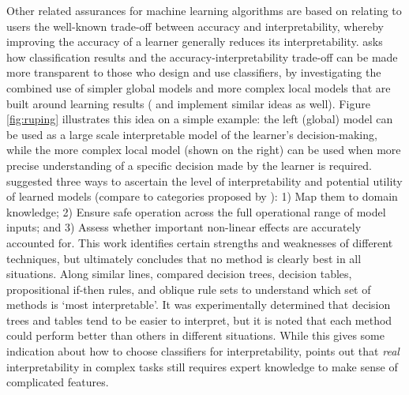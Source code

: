 Other related assurances for machine learning algorithms are based on relating to users the well-known trade-off between accuracy and interpretability, whereby improving the accuracy of a learner generally reduces its interpretability. \citet{Ruping2006-xj} asks how classification results and the accuracy-interpretability trade-off can be made more transparent to those who design and use classifiers, by investigating the combined use of simpler global models and more complex local models that are built around learning results (\citet{Otte2013-oo} and \citet{Ribeiro2016-uc} implement similar ideas as well). 
Figure \ref{fig:ruping} illustrates this idea on a simple example: the left (global) model can be used as a large scale interpretable model of the learner's decision-making, while the more complex local model (shown on the right) can be used when more precise understanding of a specific decision made by the learner is required. 
\citet{Van_Belle2013-ph} suggested three ways to ascertain the level of interpretability and potential utility of learned models (compare to categories proposed by \citet{Lipton2016-ug}): 1) Map them to domain knowledge; 2) Ensure safe operation across the full operational range of model inputs; and 3) Assess whether important non-linear effects are accurately accounted for. 
This work identifies certain strengths and weaknesses of different techniques, but ultimately concludes that no method is clearly best in all situations. 
Along similar lines, \citet{Huysmans2011-th} compared decision trees, decision tables, propositional if-then rules, and oblique rule sets to understand which set of methods is `most interpretable'. 
It was experimentally determined that decision trees and tables tend to be easier to interpret, but it is noted that each method could perform better than others in different situations. 
While this gives some indication about how to choose classifiers for interpretability, \citeauthor{Park2016-ld} %
points out that \emph{real} interpretability in complex tasks still requires expert knowledge to make sense of complicated features. 
